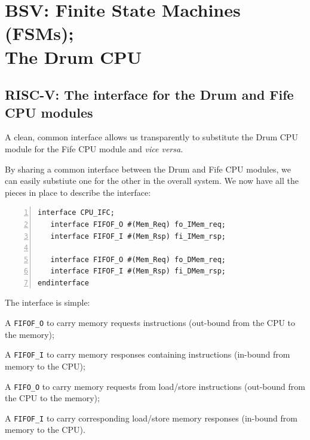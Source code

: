 

\chapter{BSV: Finite State Machines (FSMs); \\
The Drum CPU}


\setcounter{page}{1}
\renewcommand{\thepage}{\arabic{chapter}-\arabic{page}}

\label{ch_FSMs}


\section{RISC-V: The interface for the Drum and Fife CPU modules}

\label{Sec_CPU_Module_Skeleton_CPU_interface}

A clean, common interface allows us transparently to substitute the
Drum CPU module for the Fife CPU module and \emph{vice versa}.

By sharing a common interface between the Drum and Fife CPU
modules, we can easily substiute one for the other in the overall
system.  We now have all the pieces in place to describe the interface:


\begin{Verbatim}[frame=single, numbers=left]
interface CPU_IFC;
   interface FIFOF_O #(Mem_Req) fo_IMem_req;
   interface FIFOF_I #(Mem_Rsp) fi_IMem_rsp;

   interface FIFOF_O #(Mem_Req) fo_DMem_req;
   interface FIFOF_I #(Mem_Rsp) fi_DMem_rsp;
endinterface
\end{Verbatim}

The interface is simple:

\begin{tightlist}

\item A \verb|FIFOF_O| to carry memory requests instructions (out-bound
from the CPU to the memory);

\item A \verb|FIFOF_I| to carry memory responses containing
instructions (in-bound from memory to the CPU);

\item A \verb|FIFO_O| to carry memory requests from load/store
instructions (out-bound from the CPU to the memory);

\item A \verb|FIFOF_I| to carry corresponding load/store memory
responses (in-bound from memory to the CPU).

\end{tightlist}

